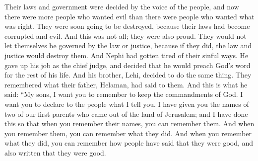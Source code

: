 \bverse \iffalse For as their laws and their governments were established by the voice of the people, and they who chose evil were more numerous than they who chose good, therefore they were ripening for destruction, for the laws had become corrupted. \fi
Their laws and government were decided by the voice of the people, and now there were more people who wanted evil than there were people who wanted what was right. They were soon going to be destroyed, because their laws had become corrupted and evil.
\bverse \iffalse Yea, and this was not all; they were a stiffnecked people, insomuch that they could not be governed by the law nor justice, save it were to their destruction. \fi
And this was not all; they were also proud. They would not let themselves be governed by the law or justice, because if they did, the law and justice would destroy them.
\bverse \iffalse And it came to pass that Nephi had become weary because of their iniquity; and he yielded up the judgment-seat, and took it upon him to preach the word of God all the remainder of his days, and his brother Lehi also, all the remainder of his days; \fi
And Nephi had gotten tired of their sinful ways. He gave up his job as the chief judge, and decided that he would preach God's word for the rest of his life. And his brother, Lehi, decided to do the same thing.
\bverse \iffalse For they remembered the words which their father Helaman spake unto them. And these are the words which he spake: \fi
They remembered what their father, Helaman, had said to them. And this is what he said:
\bverse \iffalse Behold, my sons, I desire that ye should remember to keep the commandments of God; and I would that ye should declare unto the people these words. Behold, I have given unto you the names of our first parents who came out of the land of Jerusalem; and this I have done that when you remember your names ye may remember them; and when ye remember them ye may remember their works; and when ye remember their works ye may know how that it is said, and also written, that they were good. \fi
``My sons, I want you to remember to keep the commandments of God. I want you to declare to the people what I tell you. I have given you the names of two of our first parents who came out of the land of Jerusalem; and I have done this so that when you remember their names, you can remember them. And when you remember them, you can remember what they did. And when you remember what they did, you can remember how people have said that they were good, and also written that they were good.
